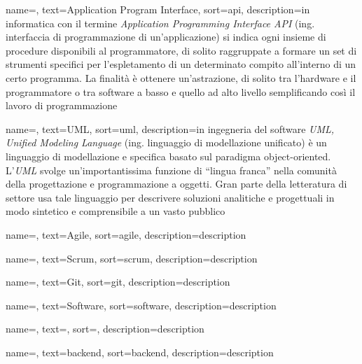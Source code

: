 

 {
    name=,
    text=Application Program Interface,
    sort=api,
    description={in informatica con il termine \emph{Application Programming Interface API} (ing. interfaccia di programmazione di un'applicazione) si indica
    ogni insieme di procedure disponibili al programmatore, di solito raggruppate a formare un set di strumenti specifici per l'espletamento di un determinato
    compito all'interno di un certo programma. La finalità è ottenere un'astrazione, di solito tra l'hardware e il programmatore o tra software a basso 
    e quello ad alto livello semplificando così il lavoro di programmazione}
}

 {
    name=,
    text=UML,
    sort=uml,
    description={in ingegneria del software \emph{UML, Unified Modeling Language} (ing. linguaggio di modellazione unificato) è un linguaggio di 
    modellazione e specifica basato sul paradigma object-oriented. L'\emph{UML} svolge un'importantissima funzione di ``lingua franca'' nella comunità 
    della progettazione e programmazione a oggetti. Gran parte della letteratura di settore usa tale linguaggio per descrivere soluzioni analitiche e 
    progettuali in modo sintetico e comprensibile a un vasto pubblico}
}

 {
    name=,
    text=Agile,
    sort=agile,
    description={description}
}

 {
    name=,
    text=Scrum,
    sort=scrum,
    description={description}
}

 {
    name=,
    text=Git,
    sort=git,
    description={description}
}

 {
    name=,
    text=Software,
    sort=software,
    description={description}
}

 {
    name=,
    text=,
    sort=,
    description={description}
}

 {
    name=,
    text=backend,
    sort=backend,
    description={description}
}


